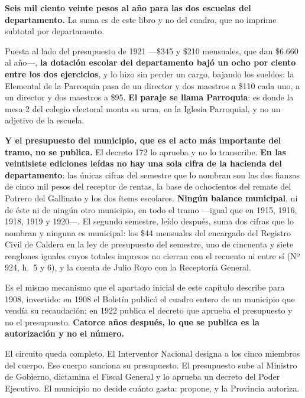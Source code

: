 \begin{cautela}
\textbf{Seis mil ciento veinte pesos al año para las dos escuelas del departamento.} La suma es de
este libro y no del cuadro, que no imprime subtotal por departamento.

Puesta al lado del presupuesto de 1921 ---\$345 y \$210 mensuales, que dan \$6.660 al año---,
\textbf{la dotación escolar del departamento bajó un ocho por ciento entre los dos ejercicios}, y
lo hizo sin perder un cargo, bajando los sueldos: la Elemental de la Parroquia pasa de un director y dos maestros a
\$110 cada uno, a un director y dos maestros a \$95. \textbf{El paraje se llama Parroquia}: es
donde la mesa 2 del colegio electoral monta su urna, en la Iglesia Parroquial, y no un adjetivo
de la escuela.
\end{cautela}

\begin{cautela}
\textbf{Y el presupuesto del municipio, que es el acto más importante del tramo, no se publica.}
El decreto 172 lo aprueba y no lo transcribe. \textbf{En las veintisiete ediciones leídas no hay
una sola cifra de la hacienda del departamento}: las únicas cifras del semestre que lo nombran son las
dos fianzas de cinco mil pesos del receptor de rentas, la base de ochocientos del remate del
Potrero del Gallinato y los dos ítems escolares. \textbf{Ningún balance municipal}, ni de éste ni
de ningún otro municipio, en todo el tramo ---igual que en 1915, 1916, 1918, 1919 y 1920---. El
segundo semestre, leído después, suma dos cifras que lo nombran y ninguna es municipal: los \$44
mensuales del encargado del Registro Civil de Caldera en la ley de presupuesto del semestre, uno de
cincuenta y siete renglones iguales cuyos totales impresos no cierran con el recuento ni entre sí
(Nº 924, h.\ 5 y 6), y la cuenta de Julio Royo con la Receptoría General.

Es el mismo mecanismo que el apartado inicial de este capítulo describe para 1908, invertido: en
1908 el Boletín publicó el cuadro entero de un municipio que vendía su recaudación; en 1922
publica el decreto que aprueba el presupuesto y no el presupuesto. \textbf{Catorce años después,
lo que se publica es la autorización y no el número.}
\end{cautela}

El circuito queda completo. El Interventor Nacional designa a los cinco miembros del cuerpo. Ese
cuerpo sanciona su presupuesto. El presupuesto sube al Ministro de Gobierno, dictamina el
Fiscal General y lo aprueba un decreto del Poder Ejecutivo. El municipio no decide cuánto
gasta: propone, y la Provincia autoriza.

